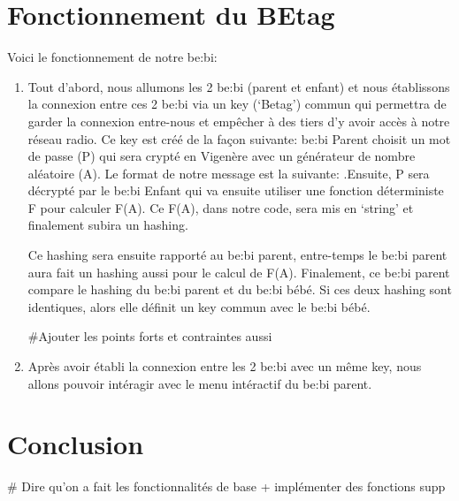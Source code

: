 \documentclass [11pt]{article}
\begin{document}
\section{Fonctionnement du BEtag}
\noindent Voici le fonctionnement de notre be\string:bi:
\begin{enumerate}
    \item Tout d’abord, nous allumons les 2 be\string:bi (parent et enfant) et nous établissons la connexion entre ces 2 be\string:bi via un key (‘Betag’) commun qui permettra de garder la connexion entre-nous et empêcher à des tiers d’y avoir accès à notre réseau radio. Ce key est créé de la façon suivante:
be\string:bi Parent choisit un mot de passe (P) qui sera crypté en Vigenère avec un générateur de nombre aléatoire (A). Le format de notre message est la suivante: .Ensuite, P sera décrypté par le be\string:bi Enfant qui va ensuite utiliser une fonction déterministe F pour calculer F(A). Ce F(A), dans notre code, sera mis en ‘string’ et finalement subira un hashing.
    
\noindent Ce hashing sera ensuite rapporté au be\string:bi parent, entre-temps le be:bi parent aura fait un hashing aussi pour le calcul de F(A). Finalement, ce be:bi parent compare le hashing du be\string:bi parent et du be\string:bi bébé. Si ces deux hashing sont identiques, alors elle définit un key commun avec le be\string:bi bébé.

#Ajouter les points forts et contraintes aussi
    
    \item Après avoir établi la connexion entre les 2 be\string:bi avec un même key, nous allons pouvoir intéragir avec le menu intéractif du be\string:bi parent.

\end{enumerate}

\section{Conclusion}
# Dire qu'on a fait les fonctionnalités de base + implémenter des fonctions supp
\end{document}
